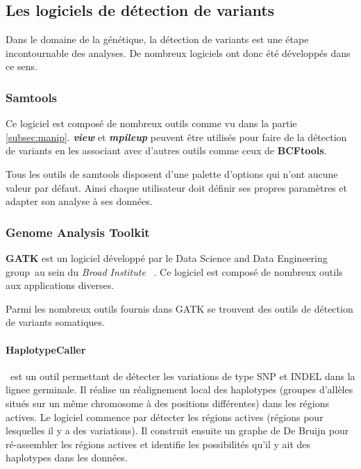 \newpage
\subsection{Les logiciels de détection de variants}\label{subsec:caller}

Dans le domaine de la génétique, la détection de variants est une étape incontournable des analyses. De nombreux logiciels ont donc été développés dans ce sens.

\subsubsection{Samtools}\label{sam}

Ce logiciel est composé de nombreux outils comme vu dans la partie \ref{subsec:manip}. \textbf{\textit{view}} et \textbf{\textit{mpileup}} peuvent être utilisés pour faire de la détection de variants en les associant avec d'autres outils comme ceux de \textbf{BCFtools}. 

Tous les outils de samtools disposent d'une palette d'options qui n'ont aucune valeur par défaut. Ainsi chaque utilisateur doit définir ses propres paramètres et adapter son analyse à ses données.

\subsubsection{Genome Analysis Toolkit}\label{GATK}

\textbf{GATK} est un logiciel développé par le \og Data Science and Data Engineering group\fg ~au sein du \textit{Broad Institute} ~\citep{GATK1}. Ce logiciel est composé de nombreux outils aux applications diverses.

Parmi les nombreux outils fournis dans GATK se trouvent des outils de détection de variants somatiques. 

\paragraph*{HaplotypeCaller} ~est un outil permettant de détecter les variations de type SNP et INDEL dans la \gls {lignee germinale}. Il réalise un réalignement local des haplotypes (groupes d'allèles situés sur un même chromosome à des positions différentes) dans les régions actives. Le logiciel commence par détecter les régions actives (régions pour lesquelles il y a des variations). Il construit ensuite un graphe de De Bruijn pour ré-assembler les régions actives et identifie les possibilités qu'il y ait des haplotypes dans les données.

